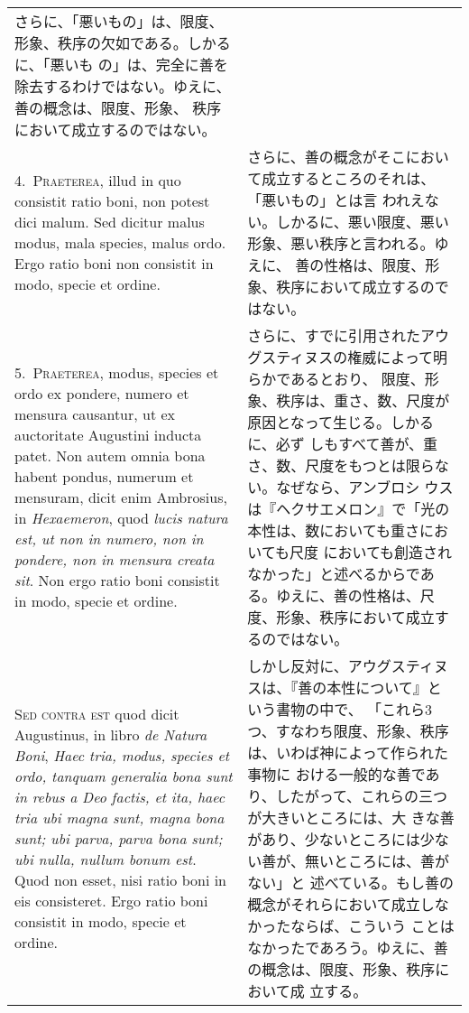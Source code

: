 \documentclass[10pt]{jsarticle} %
\begin{document}
\begin{longtable}{p{21em}p{21em}}
さらに、「悪いもの」は、限度、形象、秩序の欠如である。しかるに、「悪いも
 の」は、完全に善を除去するわけではない。ゆえに、善の概念は、限度、形象、
 秩序において成立するのではない。

\\


4.~{\scshape Praeterea}, illud in quo consistit ratio boni, non potest dici
 malum. Sed dicitur malus modus, mala species, malus ordo. Ergo ratio
 boni non consistit in modo, specie et ordine.

&

さらに、善の概念がそこにおいて成立するところのそれは、「悪いもの」とは言
 われえない。しかるに、悪い限度、悪い形象、悪い秩序と言われる。ゆえに、
 善の性格は、限度、形象、秩序において成立するのではない。

\\


5.~{\scshape Praeterea}, modus, species et ordo ex pondere, numero et
 mensura causantur, ut ex auctoritate Augustini inducta patet. Non autem
 omnia bona habent pondus, numerum et mensuram, dicit enim Ambrosius, in
 {\itshape Hexaemeron}, quod {\itshape lucis natura est, ut non in
 numero, non in pondere, non in mensura creata sit}. Non ergo ratio boni
 consistit in modo, specie et ordine.

&


さらに、すでに引用されたアウグスティヌスの権威によって明らかであるとおり、
 限度、形象、秩序は、重さ、数、尺度が原因となって生じる。しかるに、必ず
 しもすべて善が、重さ、数、尺度をもつとは限らない。なぜなら、アンブロシ
 ウスは『ヘクサエメロン』で「光の本性は、数においても重さにおいても尺度
 においても創造されなかった」と述べるからである。ゆえに、善の性格は、尺
 度、形象、秩序において成立するのではない。



\\

{\scshape Sed contra est} quod dicit Augustinus, in libro {\itshape de
 Natura Boni}, {\itshape Haec tria, modus, species et ordo, tanquam
 generalia bona sunt in rebus a Deo factis, et ita, haec tria ubi magna
 sunt, magna bona sunt; ubi parva, parva bona sunt; ubi nulla, nullum
 bonum est}. Quod non esset, nisi ratio boni in eis consisteret. Ergo
 ratio boni consistit in modo, specie et ordine.

&

しかし反対に、アウグスティヌスは、『善の本性について』という書物の中で、
 「これら3つ、すなわち限度、形象、秩序は、いわば神によって作られた事物に
 おける一般的な善であり、したがって、これらの三つが大きいところには、大
 きな善があり、少ないところには少ない善が、無いところには、善がない」と
 述べている。もし善の概念がそれらにおいて成立しなかったならば、こういう
 ことはなかったであろう。ゆえに、善の概念は、限度、形象、秩序において成
 立する。


\end{longtable}
\end{document}
